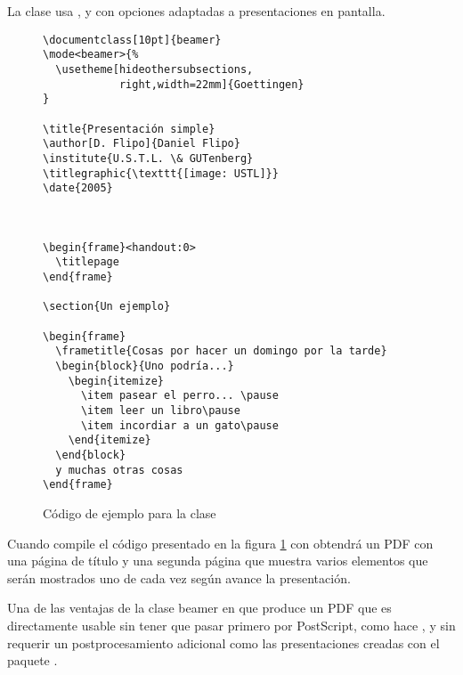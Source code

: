 La clase  usa ,  y  con opciones adaptadas a presentaciones en pantalla.

\begin{figure}[htbp]
\begin{verbatim}
\documentclass[10pt]{beamer}
\mode<beamer>{%
  \usetheme[hideothersubsections,
            right,width=22mm]{Goettingen}
}

\title{Presentación simple}
\author[D. Flipo]{Daniel Flipo}
\institute{U.S.T.L. \& GUTenberg}
\titlegraphic{\texttt{[image: USTL]}}
\date{2005}



\begin{frame}<handout:0>
  \titlepage
\end{frame}

\section{Un ejemplo}

\begin{frame}
  \frametitle{Cosas por hacer un domingo por la tarde}
  \begin{block}{Uno podría...}
    \begin{itemize}
      \item pasear el perro... \pause
      \item leer un libro\pause
      \item incordiar a un gato\pause
    \end{itemize}
  \end{block}
  y muchas otras cosas
\end{frame}

\end{verbatim}
  \caption{Código de ejemplo para la clase }
  \label{fig:code-beamer}
\end{figure}

Cuando compile el código presentado en la figura \ref{fig:code-beamer} con  obtendrá un \filenomo{} PDF con una página de título y una segunda página que muestra varios elementos que serán mostrados uno de cada vez según avance la presentación.

Una de las ventajas de la clase beamer en que produce un \filenomo{} PDF que es directamente usable sin tener que pasar primero por PostScript, como hace , y sin requerir un postprocesamiento adicional como las presentaciones creadas con el paquete .

